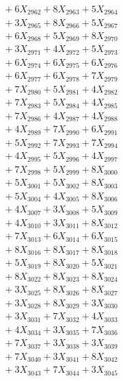 \documentclass[a4paper,10pt]{article}
\begin{document}
{\begin{align}
&\;  + 6 X_{2962} + 8 X_{2963} + 5 X_{2964} \\[0.3ex]
&\;  + 3 X_{2965} + 8 X_{2966} + 5 X_{2967} \\[0.3ex]
&\;  + 6 X_{2968} + 5 X_{2969} + 8 X_{2970} \\[0.3ex]
&\;  + 3 X_{2971} + 4 X_{2972} + 5 X_{2973} \\[0.3ex]
&\;  + 6 X_{2974} + 6 X_{2975} + 6 X_{2976} \\[0.3ex]
&\;  + 6 X_{2977} + 6 X_{2978} + 7 X_{2979} \\[0.5ex]\allowbreak
&\;  + 7 X_{2980} + 5 X_{2981} + 4 X_{2982} \\[0.3ex]
&\;  + 7 X_{2983} + 5 X_{2984} + 4 X_{2985} \\[0.3ex]
&\;  + 7 X_{2986} + 4 X_{2987} + 4 X_{2988} \\[0.3ex]
&\;  + 4 X_{2989} + 7 X_{2990} + 6 X_{2991} \\[0.3ex]
&\;  + 5 X_{2992} + 7 X_{2993} + 7 X_{2994} \\[0.3ex]
&\;  + 4 X_{2995} + 5 X_{2996} + 4 X_{2997} \\[0.3ex]
&\;  + 7 X_{2998} + 5 X_{2999} + 8 X_{3000} \\[0.3ex]
&\;  + 5 X_{3001} + 5 X_{3002} + 8 X_{3003} \\[0.3ex]
&\;  + 5 X_{3004} + 4 X_{3005} + 8 X_{3006} \\[0.3ex]
&\;  + 4 X_{3007} + 3 X_{3008} + 5 X_{3009} \\[0.5ex]\allowbreak
&\;  + 4 X_{3010} + 3 X_{3011} + 8 X_{3012} \\[0.3ex]
&\;  + 7 X_{3013} + 6 X_{3014} + 6 X_{3015} \\[0.3ex]
&\;  + 8 X_{3016} + 8 X_{3017} + 8 X_{3018} \\[0.3ex]
&\;  + 5 X_{3019} + 8 X_{3020} + 5 X_{3021} \\[0.3ex]
&\;  + 8 X_{3022} + 8 X_{3023} + 8 X_{3024} \\[0.3ex]
&\;  + 3 X_{3025} + 8 X_{3026} + 8 X_{3027} \\[0.3ex]
&\;  + 3 X_{3028} + 8 X_{3029} + 3 X_{3030} \\[0.3ex]
&\;  + 3 X_{3031} + 7 X_{3032} + 4 X_{3033} \\[0.3ex]
&\;  + 4 X_{3034} + 3 X_{3035} + 7 X_{3036} \\[0.3ex]
&\;  + 7 X_{3037} + 3 X_{3038} + 3 X_{3039} \\[0.5ex]\allowbreak
&\;  + 7 X_{3040} + 3 X_{3041} + 8 X_{3042} \\[0.3ex]
&\;  + 3 X_{3043} + 7 X_{3044} + 3 X_{3045} \\[0.3ex]

\end{align}}
\end{document}
